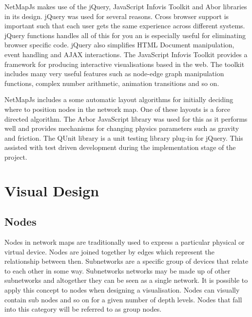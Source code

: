 \documentclass[11pt, a4paper]{article}
\begin{document}
NetMapJs makes use of the jQuery, JavaScript Infovis Toolkit and Abor libraries
in its design. jQuery was used for several reasons.\cite{jQuery_website} Cross
browser support is important such that each user gets the same experience across
different systems.  jQuery functions handles all of this for you an is
especially useful for eliminating browser specific code. jQuery also simplifies
HTML Document manipulation, event handling and AJAX interactions. The JavaScript
Infovis Toolkit provides a framework for producing interactive visualisations
based in the web.\cite{thejit_website} The toolkit includes many very useful
features such as node-edge graph manipulation functions, complex number
arithmetic, animation transitions and so on.

NetMapJs includes a some automatic layout algorithms for initially deciding
where to position nodes in the network map. One of these layouts is a force
directed algorithm.  The Arbor JavaScript library was used for this as it
performs well and provides mechanisms for changing physics parameters such as
gravity and friction.\cite{Arbor_website} The QUnit library is a unit testing
library plug-in for jQuery. This assisted with test driven development during
the implementation stage of the project.


\section{Visual Design} \label{sec:visual-design}

\subsection{Nodes}
\label{sec:nodes}


Nodes in network maps are traditionally used to express a particular physical or
virtual device. Nodes are joined together by edges which represent the
relationship between then. Subnetworks are a specific group of devices that
relate to each other in some way. Subnetworks networks may be made up of other
subnetworks and altogether they can be seen as a single network. It is possible
to apply this concept to nodes when designing a visualisation. Nodes can
visually contain sub nodes and so on for a given number of depth levels. Nodes
that fall into this category will be referred to as group nodes.
\end{document}
